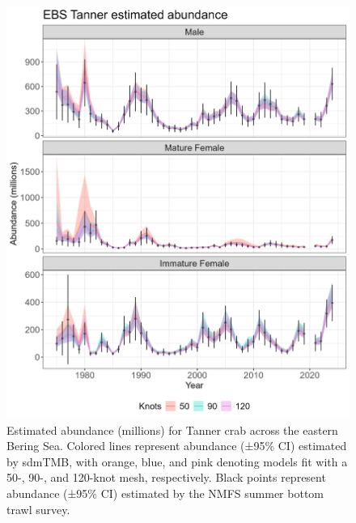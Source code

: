 \documentclass[
]{article}
\begin{document}
\begin{figure}

{\centering \includegraphics[width=1\linewidth,height=1\textheight]{../BAIRDI/Figures/TannerEBS.abundance.index} 

}

\caption{Estimated abundance (millions) for Tanner crab across the eastern Bering Sea. Colored lines represent abundance (±95\% CI) estimated by sdmTMB, with orange, blue, and pink denoting models fit with a 50-, 90-, and 120-knot mesh, respectively. Black points represent abundance (±95\% CI) estimated by the NMFS summer bottom trawl survey.}\label{fig:bairdi-abund-index}
\end{figure}
\end{document}
